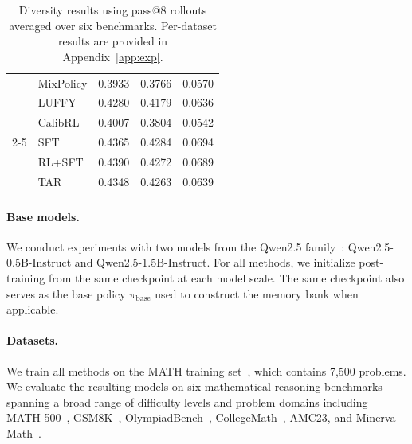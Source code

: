 \documentclass[11pt]{article}
\newcommand{\model}{\textsc{TAR}\xspace}
\begin{document}
\begin{table}[!t]
{\begin{tabular}{clccc}
& MixPolicy   & 0.3933 & 0.3766 & 0.0570 \\
& LUFFY       & 0.4280 & 0.4179 & 0.0636 \\
& CalibRL     & 0.4007 & 0.3804 & 0.0542 \\

\cmidrule(lr){2-5}

& SFT         & 0.4365 & 0.4284 & 0.0694 \\
& RL+SFT      & 0.4390 & 0.4272 & 0.0689 \\
& \model      & 0.4348 & 0.4263 & 0.0639 \\

\bottomrule
\end{tabular}%
}
\caption{
Diversity results using pass@8 rollouts averaged over six benchmarks. Per-dataset results are provided in Appendix~\ref{app:exp}.
}
\label{tab:diversity}

\end{table}


\paragraph{Base models.}
We conduct experiments with two models from the Qwen2.5 family~\cite{qwen25}: Qwen2.5-0.5B-Instruct and Qwen2.5-1.5B-Instruct.
For all methods, we initialize post-training from the same checkpoint at each model scale.
The same checkpoint also serves as the base policy $\pi_{\mathrm{base}}$ used to construct the memory bank when applicable.

\paragraph{Datasets.}
We train all methods on the MATH training set~\cite{hendrycks2021math}, which contains 7,500 problems.
We evaluate the resulting models on six mathematical reasoning benchmarks spanning a broad range of difficulty levels and problem domains including MATH-500~\cite{lightman2024verify}, GSM8K~\cite{cobbe2021gsm8k}, OlympiadBench~\cite{he2024olympiadbench}, CollegeMath~\cite{tang2024mathscale}, AMC23, and Minerva-Math~\cite{lewkowycz2022minerva}.
\end{document}
